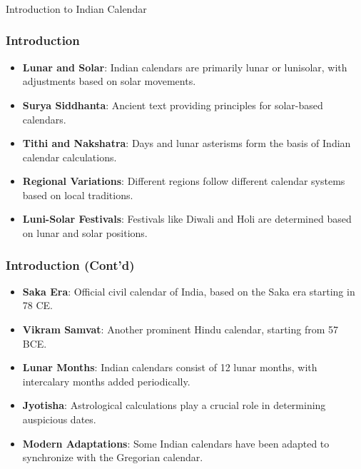 \begin{frame}[fragile]\frametitle{}
\begin{center}
{\Large Introduction to Indian Calendar}
\end{center}
\end{frame}

\begin{frame}[fragile]\frametitle{Introduction}
    
    \begin{itemize}
        \item \textbf{Lunar and Solar}: Indian calendars are primarily lunar or lunisolar, with adjustments based on solar movements.
        \item \textbf{Surya Siddhanta}: Ancient text providing principles for solar-based calendars.
        \item \textbf{Tithi and Nakshatra}: Days and lunar asterisms form the basis of Indian calendar calculations.
        \item \textbf{Regional Variations}: Different regions follow different calendar systems based on local traditions.
        \item \textbf{Luni-Solar Festivals}: Festivals like Diwali and Holi are determined based on lunar and solar positions.
    \end{itemize}
\end{frame}

\begin{frame}[fragile]\frametitle{Introduction (Cont'd)}
    
    \begin{itemize}
        \item \textbf{Saka Era}: Official civil calendar of India, based on the Saka era starting in 78 CE.
        \item \textbf{Vikram Samvat}: Another prominent Hindu calendar, starting from 57 BCE.
        \item \textbf{Lunar Months}: Indian calendars consist of 12 lunar months, with intercalary months added periodically.
        \item \textbf{Jyotisha}: Astrological calculations play a crucial role in determining auspicious dates.
        \item \textbf{Modern Adaptations}: Some Indian calendars have been adapted to synchronize with the Gregorian calendar.
    \end{itemize}
\end{frame}
